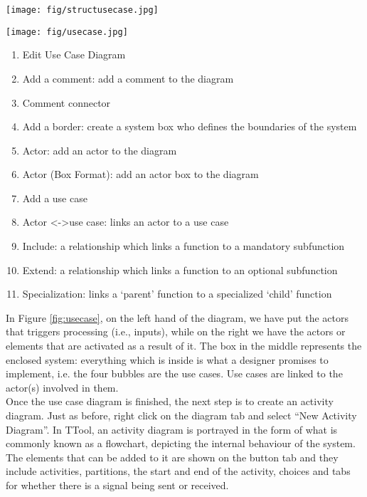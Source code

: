 \documentclass[12pt]{article}
\begin{document}
\begin{figure*}[htbp]
\centering
\texttt{[image: fig/structusecase.jpg]}
\caption{Structural elements of the use case diagram} \label{fig:structusecase}
\end{figure*}

\begin{figure*}[htbp]
\centering
\texttt{[image: fig/usecase.jpg]}
\caption{Use Case Diagram} \label{fig:usecase}
\end{figure*}



\begin{enumerate}
\item Edit Use Case Diagram
\item Add a comment: add a comment to the diagram
\item Comment connector
\item Add a border: create a system box who defines the boundaries of the system
\item Actor: add an actor to the diagram
\item Actor (Box Format): add an actor box to the diagram
\item Add a use case
\item Actor <->use case: links an actor to a use case
\item Include: a relationship which links a function to a mandatory subfunction
\item Extend: a relationship which links a function to an optional subfunction
\item Specialization: links a `parent' function to a specialized  `child' function
\end{enumerate}

In Figure \ref{fig:usecase}, on the left hand of the diagram, we have put the actors that triggers processing (i.e., inputs), while on the right we have the actors or elements that are activated as a result of it. The box in the middle represents the enclosed system: everything which is inside is what a designer promises to implement, i.e. the four bubbles are the use cases. Use cases are linked to the actor(s) involved in them. \\

Once the use case diagram is finished, the next step is to create an activity diagram. Just as before, right click on the diagram tab and select “New Activity Diagram”.  In TTool, an activity diagram is portrayed in the form of what is commonly known as a flowchart, depicting the internal behaviour of the system. The elements that can be added to it are shown on the button tab and they include activities, partitions, the start and end of the activity, choices and tabs for whether there is a signal being sent or received. 
\end{document}
